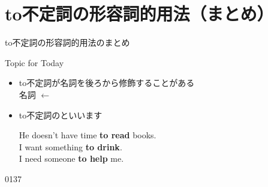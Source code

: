 \documentclass[aspectratio=169,xcolor={dvipsnames,table}]{beamer}
\begin{document}
\section{to不定詞の形容詞的用法（まとめ）}
\begin{frame}[plain]{to不定詞の形容詞的用法のまとめ}
 
\begin{block}{Topic for Today}
\begin{itemize}[square]\small
 \item to不定詞が名詞を後ろから修飾することがある\\
\hfill\hfill{}名詞 $\longleftarrow$ \hfill~
 \item to不定詞のといいます


\hfill{}{\scriptsize He doesn't have time \textbf{to read} books.}\\
\hfill{}{\scriptsize I want something \textbf{to drink}.}\\
\hfill{}{\scriptsize I need someone \textbf{to help} me.}

 \end{itemize}
     \end{block}
\hfill{\tiny 0137}\,{\scriptsize {}}\

\end{frame}
\end{document}
